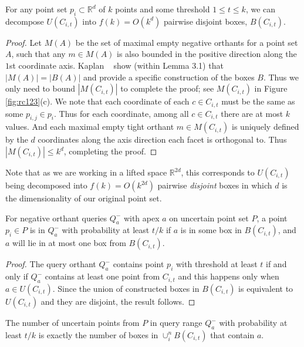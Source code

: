 \documentclass[11pt]{myclass}
\newcommand{\bl}[1]{\ensuremath{\mathbb{#1}}}
\begin{document}
\begin{lemma}
For any point set $p_i \subset \bl{R}^d$ of $k$ points and some threshold $1 \leq t \leq k$, we can decompose $U(C_{i,t})$ into $f(k) = O(k^d)$ pairwise disjoint boxes, $B(C_{i,t})$.
\end{lemma}
 
\begin{proof}
Let $M(A)$ be the set of maximal empty negative orthants for a point set $A$, such that any $m \in M(A)$ is also bounded in the positive direction 
along the $1$st coordinate axis.  
Kaplan \etal~\cite{colors} show (within Lemma 3.1) that $|M(A)| = |B(A)|$ and provide a specific construction of the boxes $B$.  Thus we only need to bound $|M(C_{i,t})|$ to complete the proof; see $M(C_{i,t})$ in Figure \ref{fig:rc123}(c).  
We note that each coordinate of each $c \in C_{i,t}$ must be the same as some $p_{i,j} \in p_i$.  Thus for each coordinate, among all $c \in C_{i,t}$ there are at most $k$ values.  And each maximal empty tight orthant $m \in M(C_{i,t})$ is uniquely defined by the $d$ coordinates along the axis direction each facet is orthogonal to.  Thus $|M(C_{i,t})|  \leq k^d$, completing the proof.  
\end{proof}
 
Note that as we are working in a lifted space $\bl{R}^{2d}$, this corresponds to $U(C_{i,t})$ being decomposed into $f(k) = O(k^{2d})$ pairwise \emph{disjoint} boxes in which $d$ is the dimensionality of our original point set.

 
\begin{lemma}
For negative orthant queries $Q_a^-$ with apex $a$ on uncertain point set $P$, a point $p_i \in P$ is in $Q_a^-$ with probability at least $t/k$ if $a$ is in some box in $B(C_{i,t})$, and $a$ will lie in at most one box from $B(C_{i,t})$.  
 \end{lemma}
\begin{proof}
The query orthant $Q_a^-$ contains point $p_i$ with threshold at least $t$ if and only if $Q_a^-$ contains at least one point from $C_{i,t}$ and this happens only when $a \in U(C_{i,t})$. Since the union of constructed boxes in $B(C_{i,t})$ is equivalent to $U(C_{i,t})$ and they are disjoint, the result follows.
\end{proof} 
 
\begin{corollary}
The number of uncertain points from $P$ in query range $Q_a^-$ with probability at least $t/k$ is exactly the number of boxes in $\cup_i^n B(C_{i,t})$ that contain $a$.  
 \end{corollary}
 
\end{document}
